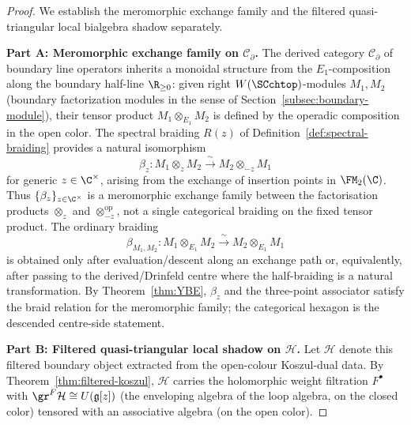 \begin{proof}
We establish the meromorphic exchange family and the filtered
quasi-triangular local bialgebra shadow separately.

\medskip
\noindent\textbf{Part A: Meromorphic exchange family on $\mathcal{C}_\partial$.}
The derived category $\mathcal{C}_\partial$ of boundary line operators inherits a monoidal structure from the $E_1$-composition along the boundary half-line $\R_{\geq 0}$: given right $W(\SCchtop)$-modules $M_1, M_2$ (boundary factorization modules in the sense of Section~\ref{subsec:boundary-module}), their tensor product $M_1 \otimes_{E_1} M_2$ is defined by the operadic composition in the open color. The spectral braiding $R(z)$ of Definition~\ref{def:spectral-braiding} provides a natural isomorphism
\[
\beta_z \colon M_1 \otimes_z M_2 \xrightarrow{\ \sim\ } M_2 \otimes_{-z} M_1
\]
for generic $z \in \C^\times$, arising from the exchange of insertion points in $\FM_2(\C)$. Thus $\{\beta_z\}_{z\in\C^\times}$ is a meromorphic exchange family between the factorisation products $\otimes_z$ and $\otimes_{-z}^{\mathrm{op}}$, not a single categorical braiding on the fixed tensor product. The ordinary braiding
\[
\beta_{M_1,M_2}\colon
M_1\otimes_{E_1}M_2 \xrightarrow{\ \sim\ }
M_2\otimes_{E_1}M_1
\]
is obtained only after evaluation/descent along an exchange path or,
equivalently, after passing to the derived/Drinfeld centre where the
half-braiding is a natural transformation. By Theorem~\ref{thm:YBE},
$\beta_z$ and the three-point associator satisfy the braid relation for
the meromorphic family; the categorical hexagon is the descended
centre-side statement.

\medskip
\noindent\textbf{Part B: Filtered quasi-triangular local shadow on $\mathcal{H}$.}
Let $\mathcal{H}$ denote this filtered boundary object extracted from
the open-colour Koszul-dual data. By
Theorem~\ref{thm:filtered-koszul}, $\mathcal{H}$ carries the
holomorphic weight filtration $F^\bullet$ with
$\gr^F \mathcal{H}\cong U(\mathfrak{g}[z])$ (the enveloping algebra of
the loop algebra, on the closed color) tensored with an associative
algebra (on the open color).


\end{proof}
